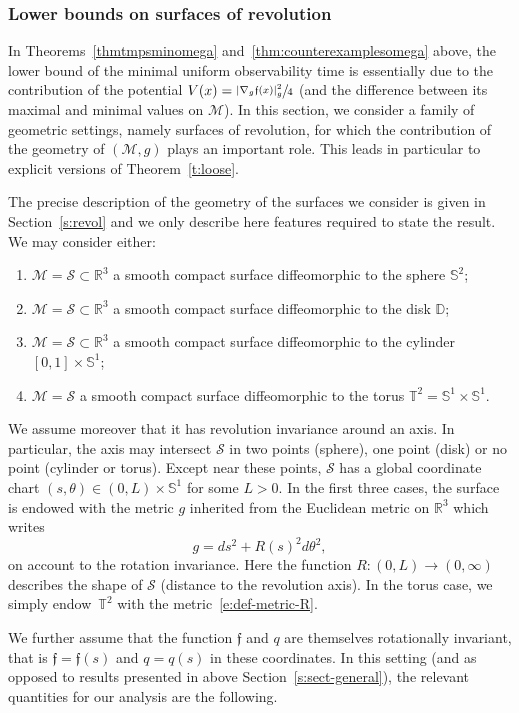 \documentclass[10pt]{amsart}
\theoremstyle{definition}
\newcommand{\M}{\ensuremath{\mathcal M}}
\newcommand{\calS}{\ensuremath{\mathcal S}}
\newcommand{\mb}[1]{\ensuremath{\mathbb{#1}}}
\newcommand{\ID}{\ensuremath{\mathbb D}}
\newcommand{\R}{{\mb{R}}}
\newcommand{\bS}{\ensuremath{\mathbb S}}
\newcommand{\T}{\ensuremath{\mathbb T}}
\newcommand{\f}{\ensuremath{\mathfrak{f}}}
\begin{document}
\subsubsection{Lower bounds on surfaces of revolution}
\label{s:revol-intro}
In Theorems~\ref{thmtmpsminomega} and~\ref{thm:counterexamplesomega} above, the lower bound of the minimal uniform observability time is essentially due to the contribution of the potential $V(x) = \sfrac{|\nabla_g \f(x)|_g^2}{4}$ (and the difference between its maximal and minimal values on $\M$).
In this section, we consider a family of geometric settings, namely surfaces of revolution, for which the contribution of the geometry of $(\M,g)$ plays an important role.
This leads in particular to explicit versions of Theorem~\ref{t:loose}.

The precise description of the geometry of the surfaces we consider is given in Section~\ref{s:revol} and we only describe here features required to state the result.
We may consider either:
\begin{enumerate}
\item $\M =\calS \subset \R^3$ a smooth compact surface diffeomorphic to the sphere $\bS^2$;
\item $\M =\calS \subset \R^3$ a smooth compact surface diffeomorphic to the disk $\ID$;
\item $\M =\calS \subset \R^3$ a smooth compact surface diffeomorphic to the cylinder $[0,1]\times \bS^1$;
\item $\M =\calS$ a smooth compact surface diffeomorphic to the torus $\T^2 = \bS^1\times \bS^1$.
\end{enumerate}
We assume moreover that it has revolution invariance around an axis. In particular, the axis may intersect $\calS$ in two points (sphere), one point (disk) or no point (cylinder or torus). Except near these points, $\calS$ has a global coordinate chart $(s,\theta)\in(0,L)\times \bS^1$ for some $L>0$.
In the first three cases, the surface is endowed with the metric $g$ inherited from the Euclidean metric on $\R^3$ which writes
\begin{equation}
\label{e:def-metric-R}
g = ds^2 +R(s)^2 d\theta^2,
\end{equation}
on account to the rotation invariance.
Here the function $R:(0,L)\to (0,\infty)$ describes the shape of $\calS$ (distance to the revolution axis).
In the torus case, we simply endow~$\T^2$ with the metric~\eqref{e:def-metric-R}.

We further assume that the function $\f$ and $q$ are themselves rotationally invariant, that is $\f=\f(s)$ and $q=q(s)$ in these coordinates.
In this setting (and as opposed to results presented in above Section~\ref{s:sect-general}), the relevant quantities for our analysis are the following.
\end{document}
